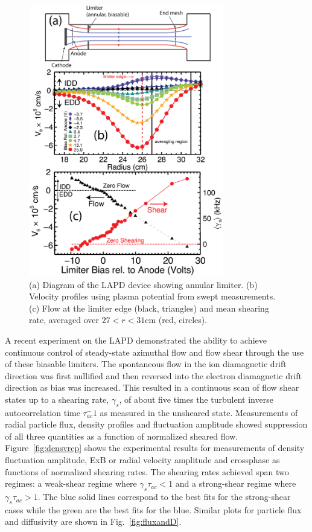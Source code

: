 \documentclass[aip,pop,amsmath,amssymb,preprint,superscriptaddress]{revtex4-1} %
\begin{document}
\begin{figure}[!htbp]
\centerline{
\includegraphics[width=8.5cm]{figure1.eps}}
\caption{\label{fig:velocity_flowshear} (a) Diagram of the LAPD device showing annular limiter.  (b) Velocity profiles using plasma potential from swept measurements. (c) Flow at the limiter edge (black, triangles) and mean shearing rate, averaged over $27 < r < 31$cm (red, circles).}
\end{figure}

A recent experiment on the LAPD demonstrated the ability to achieve continuous control of steady-state azimuthal flow and flow shear through the use of these biasable limiters. The spontaneous flow in the ion diamagnetic drift direction was first nullified and then reversed into the electron diamagnetic drift direction as bias was increased. This resulted in a continuous scan of flow shear states up to a shearing rate, $\gamma_s$, of about five times the turbulent inverse autocorrelation time  $\tau_{ac}^-1$ as measured in the unsheared state. Measurements of radial particle flux, density profiles and fluctuation amplitude showed suppression of all three quantities as a function of normalized sheared flow. Figure~\ref{fig:densvrcp} shows the experimental results for measurements of density fluctuation amplitude, ExB or radial velocity amplitude and crossphase as functions of normalized shearing rates. The shearing rates achieved span two regimes: a weak-shear regime where $\gamma_{s}\tau_{ac} < 1$ and a strong-shear regime where $\gamma_{s}\tau_{ac} > 1$. The blue solid lines correspond to the best fits for the strong-shear cases while the green are the best fits for the blue. Similar plots for particle flux and diffusivity are shown in Fig.~\ref{fig:fluxandD}.
\end{document}
